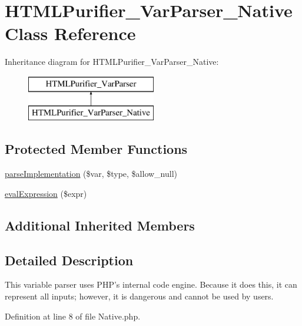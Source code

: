 \hypertarget{classHTMLPurifier__VarParser__Native}{\section{H\+T\+M\+L\+Purifier\+\_\+\+Var\+Parser\+\_\+\+Native Class Reference}
\label{classHTMLPurifier__VarParser__Native}
}
Inheritance diagram for H\+T\+M\+L\+Purifier\+\_\+\+Var\+Parser\+\_\+\+Native\+:\begin{figure}[H]
\begin{center}
\leavevmode
\includegraphics[height=2.000000cm]{classHTMLPurifier__VarParser__Native}
\end{center}
\end{figure}
\subsection*{Protected Member Functions}
\begin{DoxyCompactItemize}
\item 
\hyperlink{classHTMLPurifier__VarParser__Native_a1b6ed5c151f73080b1e2102cc7c11208}{parse\+Implementation} (\$var, \$type, \$allow\+\_\+null)
\item 
\hyperlink{classHTMLPurifier__VarParser__Native_a7d1bf7098a3124a13d8deb4dbfa89ae8}{eval\+Expression} (\$expr)
\end{DoxyCompactItemize}
\subsection*{Additional Inherited Members}


\subsection{Detailed Description}
This variable parser uses P\+H\+P's internal code engine. Because it does this, it can represent all inputs; however, it is dangerous and cannot be used by users. 

Definition at line 8 of file Native.\+php.



